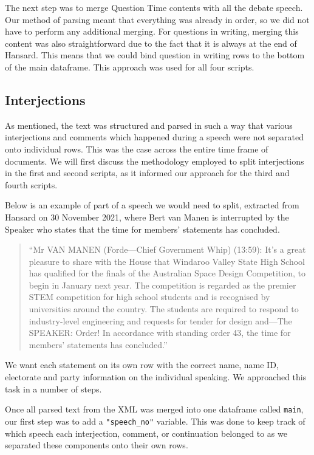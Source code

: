 \documentclass[
  letterpaper,
  DIV=11,
  numbers=noendperiod]{scrartcl}
\begin{document}
The next step was to merge Question Time contents with all the debate
speech. Our method of parsing meant that everything was already in
order, so we did not have to perform any additional merging. For
questions in writing, merging this content was also straightforward due
to the fact that it is always at the end of Hansard. This means that we
could bind question in writing rows to the bottom of the main dataframe.
This approach was used for all four scripts.

\hypertarget{sec-interject}{%
\subsection{Interjections}\label{sec-interject}}

As mentioned, the text was structured and parsed in such a way that
various interjections and comments which happened during a speech were
not separated onto individual rows. This was the case across the entire
time frame of documents. We will first discuss the methodology employed
to split interjections in the first and second scripts, as it informed
our approach for the third and fourth scripts.

Below is an example of part of a speech we would need to split,
extracted from Hansard on 30 November 2021, where Bert van Manen is
interrupted by the Speaker who states that the time for members'
statements has concluded.

\begin{quote}
``Mr VAN MANEN (Forde---Chief Government Whip) (13:59): It's a great
pleasure to share with the House that Windaroo Valley State High School
has qualified for the finals of the Australian Space Design Competition,
to begin in January next year. The competition is regarded as the
premier STEM competition for high school students and is recognised by
universities around the country. The students are required to respond to
industry-level engineering and requests for tender for design and---The
SPEAKER: Order! In accordance with standing order 43, the time for
members' statements has concluded.''
\end{quote}

We want each statement on its own row with the correct name, name ID,
electorate and party information on the individual speaking. We
approached this task in a number of steps.

Once all parsed text from the XML was merged into one dataframe called
\texttt{main}, our first step was to add a \texttt{"speech\_no"}
variable. This was done to keep track of which speech each interjection,
comment, or continuation belonged to as we separated these components
onto their own rows.
\end{document}
